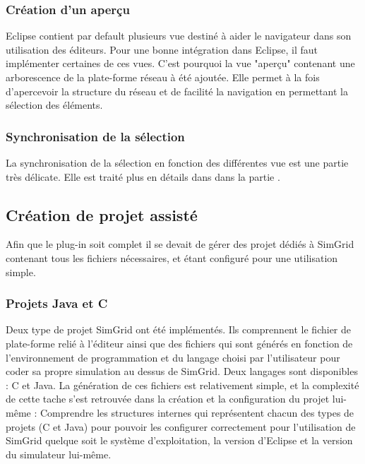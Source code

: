 \documentclass{article}
\begin{document}
        \subsubsection{Création d'un aperçu}
        Eclipse contient par default plusieurs vue destiné à aider le navigateur dans son utilisation des éditeurs. Pour une bonne intégration dans Eclipse, il faut implémenter certaines de ces vues. C'est pourquoi la vue "aperçu" contenant une arborescence de la plate-forme réseau à été ajoutée. Elle permet à la fois d'apercevoir la structure du réseau et de facilité la navigation en permettant la sélection des éléments.
    \subsubsection{Synchronisation de la sélection}
        La synchronisation de la sélection en fonction des différentes vue est une partie très délicate. Elle est traité plus en détails dans dans la partie \pageref{selection}.
%        
    \subsection{Création de projet assisté}
    Afin que le plug-in soit complet il se devait de gérer des projet dédiés à SimGrid contenant tous les fichiers nécessaires, et étant configuré pour une utilisation simple.
        \subsubsection{Projets Java et C }
        Deux type de projet SimGrid ont été implémentés. Ils
comprennent le fichier de plate-forme relié à l'éditeur ainsi que des fichiers qui sont générés en fonction de l'environnement de programmation et du langage choisi par l'utilisateur pour coder sa propre simulation au dessus de SimGrid. Deux langages sont disponibles : C et Java. La génération de ces fichiers est relativement simple, et la complexité de cette tache s'est retrouvée dans la création et la configuration du projet lui-même : Comprendre les structures internes qui représentent chacun des types de projets (C et Java) pour pouvoir les configurer correctement pour l'utilisation de SimGrid quelque soit le système d'exploitation, la version d'Eclipse et la version du simulateur lui-même.
\end{document}

